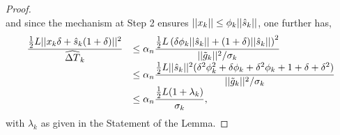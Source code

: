 \documentclass{article}[12pt]
\begin{document}
\begin{proof}
\begin{equation}
    	\end{equation}
    	and since the mechanism at Step 2 ensures $||x_k|| \leq \phi_k ||\hat{s}_{k}||$, one further has,
    	\begin{equation}
    		\label{eq:sigma-very-successful-inexact-sum_proof_4}
    		\begin{array}{ll}
    			\dfrac{\tfrac{1}{2}L||x_k \delta+\hat{s}_{k}(1+\delta)||^2}{\widehat{\Delta T}_k} & \leq \alpha_n \dfrac{\tfrac{1}{2}L\left(\delta\phi_k||\hat{s}_{k}||+(1+\delta)||\hat{s}_{k}||\right)^2}{||\tilde{g}_k||^2/\sigma_k}\\
    			& \leq \alpha_n \dfrac{\tfrac{1}{2}L||\hat{s}_{k}||^2(\delta^2\phi_k^2 + \delta\phi_k+\delta^2\phi_k +1+\delta+\delta^2)}{||\tilde{g}_k||^2/\sigma_k}\\
    			& \leq \alpha_n \dfrac{\tfrac{1}{2}L(1+\lambda_k)}{\sigma_k},
    		\end{array}
    	\end{equation}
    	with $\lambda_k$ as given in the Statement of the Lemma.
    	

\end{proof}
\end{document}
